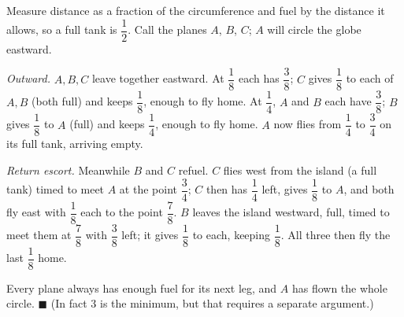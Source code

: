 Measure distance as a fraction of the circumference and fuel by the distance it allows, so a full tank is $\dfrac12$. Call the planes $A$, $B$, $C$; $A$ will circle the globe eastward.

\emph{Outward.} $A,B,C$ leave together eastward. At $\dfrac18$ each has $\dfrac38$; $C$ gives $\dfrac18$ to each of $A,B$ (both full) and keeps $\dfrac18$, enough to fly home. At $\dfrac14$, $A$ and $B$ each have $\dfrac38$; $B$ gives $\dfrac18$ to $A$ (full) and keeps $\dfrac14$, enough to fly home. $A$ now flies from $\dfrac14$ to $\dfrac34$ on its full tank, arriving empty.

\emph{Return escort.} Meanwhile $B$ and $C$ refuel. $C$ flies west from the island (a full tank) timed to meet $A$ at the point $\dfrac34$; $C$ then has $\dfrac14$ left, gives $\dfrac18$ to $A$, and both fly east with $\dfrac18$ each to the point $\dfrac78$. $B$ leaves the island westward, full, timed to meet them at $\dfrac78$ with $\dfrac38$ left; it gives $\dfrac18$ to each, keeping $\dfrac18$. All three then fly the last $\dfrac18$ home.

Every plane always has enough fuel for its next leg, and $A$ has flown the whole circle. $\blacksquare$ (In fact $3$ is the minimum, but that requires a separate argument.)

